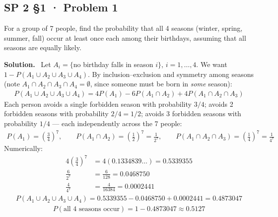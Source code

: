 \documentclass[11pt]{article}
\newcommand{\Sol}{\vspace{2pt}\noindent\textbf{Solution.}\ }
\begin{document}
\subsection{SP 2 §1 · Problem 1}
\begin{qbox}
For a group of 7 people, find the probability that all 4 seasons (winter, spring, summer, fall) occur at least once each among their birthdays, assuming that all seasons are equally likely.
\end{qbox}
\Sol
Let $A_i=\{$no birthday falls in season $i\}$, $i=1,\dots,4$. We want $1-P(A_1\cup A_2\cup A_3\cup A_4)$. By inclusion--exclusion and symmetry among seasons (note $A_1\cap A_2\cap A_3\cap A_4=\emptyset$, since someone must be born in \emph{some} season):
\begin{align*}
P(A_1\cup A_2\cup A_3\cup A_4) = 4P(A_1) - 6P(A_1\cap A_2) + 4P(A_1\cap A_2\cap A_3)
\end{align*}
Each person avoids a single forbidden season with probability $3/4$; avoids 2 forbidden seasons with probability $2/4=1/2$; avoids 3 forbidden seasons with probability $1/4$ — each independently across the 7 people:
\begin{align*}
P(A_1) = \left(\frac34\right)^7, \qquad P(A_1\cap A_2) = \left(\frac12\right)^7 = \frac{1}{2^7}, \qquad P(A_1\cap A_2\cap A_3) = \left(\frac14\right)^7 = \frac{1}{4^7}
\end{align*}
Numerically:
\begin{align*}
4\left(\frac34\right)^7 &= 4(0.1334839\ldots) = 0.5339355\\
\frac{6}{2^7} &= \frac{6}{128} = 0.0468750\\
\frac{4}{4^7} &= \frac{4}{16384} = 0.0002441
\end{align*}
\begin{align*}
P(A_1\cup A_2\cup A_3\cup A_4) = 0.5339355 - 0.0468750 + 0.0002441 = 0.4873047
\end{align*}
\begin{align*}
P(\text{all 4 seasons occur}) = 1-0.4873047 \approx 0.5127
\end{align*}

\end{document}
